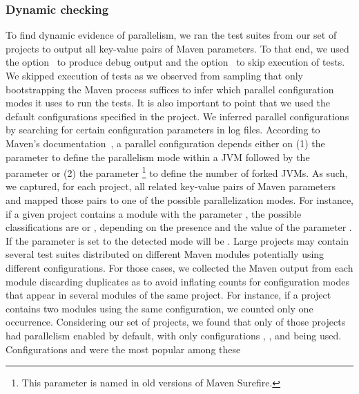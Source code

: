\vspace{1ex}
\subsubsection{Dynamic checking}
\label{sec:rqC-1}

To find dynamic evidence of parallelism, we ran the test suites from
our set of \numMedLong{} projects to output all key-value pairs of
Maven parameters.  To that end, we used the option~ to
produce debug output and the option~ to skip
execution of tests.  We skipped execution of tests as we observed from
sampling that only bootstrapping the Maven process suffices to infer
which parallel configuration modes it uses to run the
tests.  It is also important to point that we used the default
configurations specified in the project.  We inferred parallel
configurations by searching for certain configuration parameters in
log files. According to Maven's
documentation~\cite{maven-surefire-plugin}, a parallel configuration
depends either on (1) the parameter  to define the
parallelism mode within a JVM followed by the parameter
 or (2) the parameter
\footnote{This parameter is named 
  in old versions of Maven Surefire.} to define the number of forked
JVMs.  As such, we captured, for each project, all related key-value
pairs of Maven parameters and mapped those pairs to one of the
possible parallelization modes.  For instance, if a given project
contains a module with the parameter
, the possible classifications are
\ForkSeq{} or \ForkParMeth{}, depending on the presence and the value
of the parameter .  If the parameter
 is set to  the detected mode will be
\ForkParMeth{}.  Large projects may contain several test suites
distributed on different Maven modules potentially using different
configurations.  For those cases, we collected the Maven output from
each module discarding duplicates as to avoid inflating counts for
configuration modes that appear in several modules of the same
project. For instance, if a project contains two modules using the
same configuration, we counted only one occurrence.
Considering
our set of \numMedLong{} projects, we found that only
\numProjectsPar{} of those projects had parallelism enabled
by default, with only configurations \ParClassSeqMeth{},
\ParClassParMeth{}, and \ForkSeq{} being used. Configurations
\ParClassParMeth{} and \ForkSeq{} were the most popular among these

